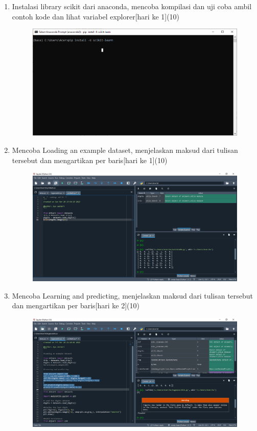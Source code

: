 \begin{enumerate}
\item
Instalasi library scikit dari anaconda, mencoba kompilasi dan uji coba ambil contoh kode dan lihat variabel explorer[hari ke 1](10)
\begin{figure}[!htbp]
		\centering
		\includegraphics[scale=0.4]{figures/1.PNG}
		
	\end{figure}
\newpage
\item
Mencoba Loading an example dataset, menjelaskan maksud dari tulisan tersebut dan mengartikan per baris[hari ke 1](10)
\begin{figure}[!htbp]
		\centering
		\includegraphics[scale=0.4]{figures/2.PNG}
	
	\end{figure}
\newpage
\item
Mencoba Learning and predicting, menjelaskan maksud dari tulisan tersebut dan mengartikan per baris[hari ke 2](10)
\begin{figure}[!htbp]
		\centering
		\includegraphics[scale=0.4]{figures/3.PNG}
	

\end{figure}
\end{enumerate}
